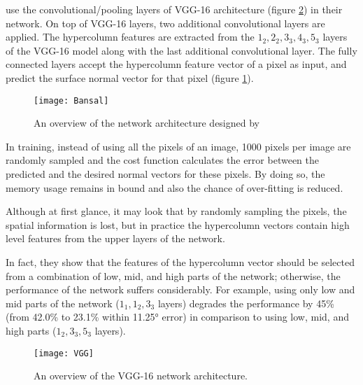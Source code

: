 \citeauthor*{bansal} \cite{bansal} use the convolutional/pooling layers of VGG-16 \cite{vgg} architecture (figure \ref{fig:vgg}) in their network. On top of VGG-16 layers, two additional convolutional layers are applied. The hypercolumn features are extracted from the \( 1_2,2_2,3_3,4_3,5_3\) layers of the VGG-16 model along with the last additional convolutional layer. The fully connected layers accept the hypercolumn feature vector of a pixel as input, and predict the surface normal vector for that pixel (figure \ref{fig:bansal}).    

\begin{figure}[h]
    \centering
    \texttt{[image: Bansal]}
    \caption{An overview of the network architecture designed by \citeauthor*{bansal} \cite{bansal}}
    \label{fig:bansal}
\end{figure}

In training, instead of using all the pixels of an image, 1000 pixels per image are randomly sampled and the cost function calculates the error between the predicted and the desired normal vectors for these pixels. By doing so, the memory usage remains in bound and also the chance of over-fitting is reduced. 

Although at first glance, it may look that by randomly sampling the pixels, the spatial information is lost, but in practice the hypercolumn vectors contain high level features from the upper layers of the network. 

In fact, they show that the features of the hypercolumn vector should be selected from a combination of low, mid, and high parts of the network; otherwise, the performance of the network suffers considerably. For example, using only low and mid parts of the network (\(1_1,1_2,3_3\) layers) degrades the performance by 45\% (from 42.0\% to 23.1\% within \ang{11.25} error) in comparison to using low, mid, and high parts (\(1_2,3_3,5_3\) layers).

\begin{figure}[h]
    \centering
    \texttt{[image: VGG]}
    \caption{An overview of the VGG-16 \cite{vgg} network architecture. }
    \label{fig:vgg}
\end{figure}

